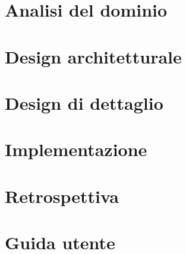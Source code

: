 \documentclass{article}
\begin{document}
\maketitle
\newpage
\tableofcontents
\newpage






\section{Analisi del dominio}
\section{Design architetturale}
\section{Design di dettaglio} 
\section{Implementazione}
\section{Retrospettiva}
\section{Guida utente}

\newpage

\end{document}
